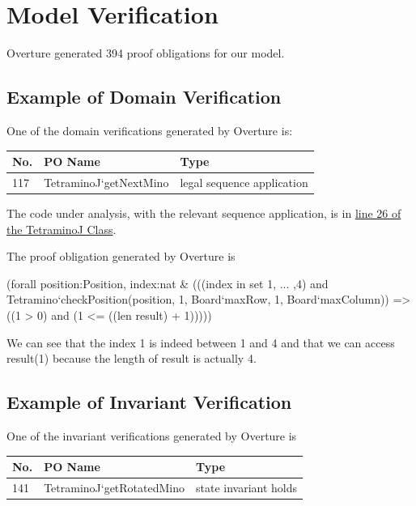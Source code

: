\documentclass[a4paper]{article}
\begin{document}
\section{Model Verification}

Overture generated 394 proof obligations for our model. 

\subsection{Example of Domain Verification} 

One of the domain verifications generated by Overture is:

\begin{table}[H]
	\centering
	\label{domain-verification}
	\begin{tabular}{|l|l|p{8.5cm}|}
		\hline
		No.  & PO Name & Type	\\	\hline
		117    & TetraminoJ`getNextMino & legal sequence application \\	\hline
	\end{tabular}
\end{table}

The code under analysis, with the relevant sequence application, is in \hyperref[getNextMino:20]{line 26 of the TetraminoJ Class}.

The proof obligation generated by Overture is
\begin{vdmpp}
(forall position:Position, index:nat 
	& (((index in set {1, ... ,4}) 
		and Tetramino`checkPosition(position, 1, Board`maxRow, 1, Board`maxColumn)) 
			=> ((1 > 0) and (1 <= ((len result) + 1)))))
\end{vdmpp}
We can see that the index 1 is indeed between 1 and 4 and that we can access result(1) because the length of result is actually 4.


\subsection{Example of Invariant Verification} 

One of the invariant verifications generated by Overture is

\begin{table}[H]
	\centering
	\label{invariant-verification}
	\begin{tabular}{|l|l|p{8.5cm}|}
		\hline
		No.  & PO Name & Type	\\	\hline
		141    & TetraminoJ`getRotatedMino & state invariant holds	\\	\hline
	\end{tabular}
\end{table}
\end{document}
